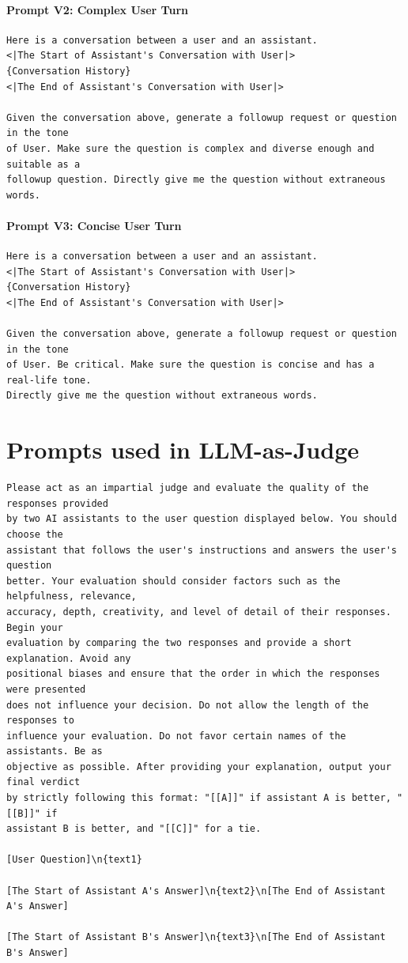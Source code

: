 \documentclass[11pt]{article}
\begin{document}
\paragraph{Prompt V2: Complex User Turn}
\begin{verbatim}
Here is a conversation between a user and an assistant.
<|The Start of Assistant's Conversation with User|>
{Conversation History}
<|The End of Assistant's Conversation with User|>

Given the conversation above, generate a followup request or question in the tone
of User. Make sure the question is complex and diverse enough and suitable as a 
followup question. Directly give me the question without extraneous words.
\end{verbatim}

\paragraph{Prompt V3: Concise User Turn}
\begin{verbatim}
Here is a conversation between a user and an assistant.
<|The Start of Assistant's Conversation with User|>
{Conversation History}
<|The End of Assistant's Conversation with User|>

Given the conversation above, generate a followup request or question in the tone
of User. Be critical. Make sure the question is concise and has a real-life tone.
Directly give me the question without extraneous words.
\end{verbatim}



\section{Prompts used in LLM-as-Judge}
\label{app:llm-as-judge-prompts}
\begin{verbatim}
Please act as an impartial judge and evaluate the quality of the responses provided 
by two AI assistants to the user question displayed below. You should choose the 
assistant that follows the user's instructions and answers the user's question 
better. Your evaluation should consider factors such as the helpfulness, relevance,
accuracy, depth, creativity, and level of detail of their responses. Begin your 
evaluation by comparing the two responses and provide a short explanation. Avoid any
positional biases and ensure that the order in which the responses were presented 
does not influence your decision. Do not allow the length of the responses to 
influence your evaluation. Do not favor certain names of the assistants. Be as 
objective as possible. After providing your explanation, output your final verdict
by strictly following this format: "[[A]]" if assistant A is better, "[[B]]" if 
assistant B is better, and "[[C]]" for a tie.

[User Question]\n{text1}

[The Start of Assistant A's Answer]\n{text2}\n[The End of Assistant A's Answer]

[The Start of Assistant B's Answer]\n{text3}\n[The End of Assistant B's Answer]
\end{verbatim}
\end{document}
